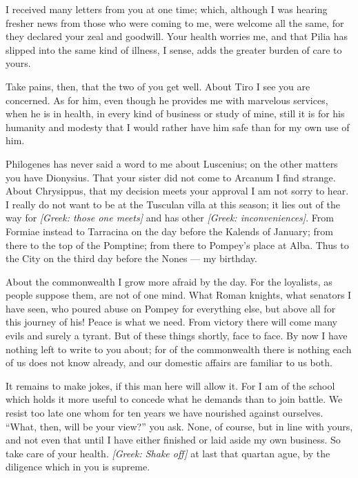 

 I received many letters from you at one time; which, although I was hearing fresher news from those who were coming to me, were welcome all the same, for they declared your zeal and goodwill. Your health worries me, and that Pilia has slipped into the same kind of illness, I sense, adds the greater burden of care to yours.

 Take pains, then, that the two of you get well. About Tiro I see you are concerned. As for him, even though he provides me with marvelous services, when he is in health, in every kind of business or study of mine, still it is for his humanity and modesty that I would rather have him safe than for my own use of him.

 Philogenes has never said a word to me about Luscenius; on the other matters you have Dionysius. That your sister did not come to Arcanum I find strange. About Chrysippus, that my decision meets your approval I am not sorry to hear. I really do not want to be at the Tusculan villa at this season; it lies out of the way for \textit{[Greek: those one meets]} and has other \textit{[Greek: inconveniences]}. From Formiae instead to Tarracina on the day before the Kalends of January; from there to the top of the Pomptine; from there to Pompey's place at Alba. Thus to the City on the third day before the Nones --- my birthday.

 About the commonwealth I grow more afraid by the day. For the loyalists, as people suppose them, are not of one mind. What Roman knights, what senators I have seen, who poured abuse on Pompey for everything else, but above all for this journey of his! Peace is what we need. From victory there will come many evils and surely a tyrant. But of these things shortly, face to face. By now I have nothing left to write to you about; for of the commonwealth there is nothing each of us does not know already, and our domestic affairs are familiar to us both.

 It remains to make jokes, if this man here will allow it. For I am of the school which holds it more useful to concede what he demands than to join battle. We resist too late one whom for ten years we have nourished against ourselves. ``What, then, will be your view?'' you ask. None, of course, but in line with yours, and not even that until I have either finished or laid aside my own business. So take care of your health. \textit{[Greek: Shake off]} at last that quartan ague, by the diligence which in you is supreme.
